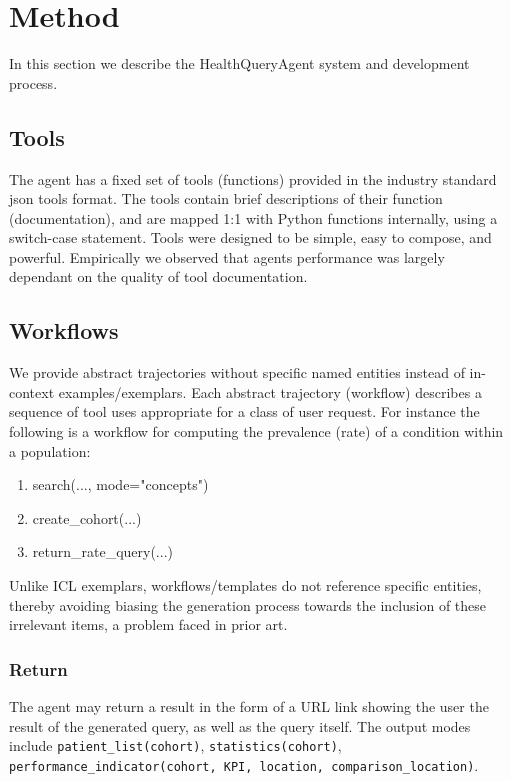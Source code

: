\documentclass[11pt]{article}
\begin{document}
\section{Method}
In this section we describe the HealthQueryAgent system and development process.


\subsection{Tools}
The agent has a fixed set of tools (functions) provided in the industry standard json tools format.
The tools contain brief descriptions of their function (documentation), and are mapped 1:1 with Python functions internally, using a switch-case statement.
Tools were designed to be simple, easy to compose, and powerful. Empirically we observed that agents performance was largely dependant on the quality of tool documentation.

\subsection{Workflows}
We provide abstract trajectories without specific named entities instead of in-context examples/exemplars.
Each abstract trajectory (workflow) describes a sequence of tool uses appropriate for a class of user request.
For instance the following is a workflow for computing the prevalence (rate) of a condition within a population:

\begin{enumerate}
	\item search(..., mode="concepts")
	\item create\_cohort(...)
	\item return\_rate\_query(...)
\end{enumerate}
Unlike ICL exemplars, workflows/templates do not reference specific entities, thereby avoiding biasing the generation process towards the inclusion of these irrelevant items, a problem faced in prior art.

\subsubsection{Return}
The agent may return a result in the form of a URL link showing the user the result of the generated query, as well as the query itself.
The output modes include \texttt{patient\_list(cohort)}, \texttt{statistics(cohort)}, \texttt{performance\_indicator(cohort, KPI, location, comparison\_location)}.
\end{document}
